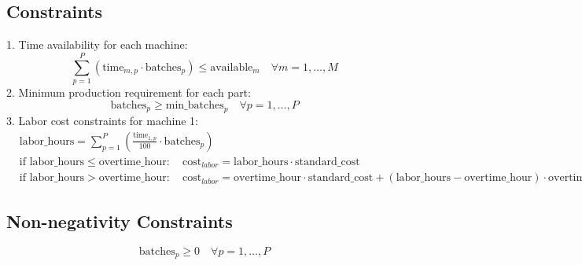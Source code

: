 \documentclass{article}
\begin{document}
\subsection*{Constraints}
1. Time availability for each machine:
\[
\sum_{p=1}^{P} \left( \text{time}_{m,p} \cdot \text{batches}_{p} \right) \leq \text{available}_{m} \quad \forall m = 1, \ldots, M
\]
2. Minimum production requirement for each part:
\[
\text{batches}_{p} \geq \text{min\_batches}_{p} \quad \forall p = 1, \ldots, P
\]
3. Labor cost constraints for machine 1:
\begin{align*}
& \text{labor\_hours} = \sum_{p=1}^{P} \left( \frac{\text{time}_{1,p}}{100} \cdot \text{batches}_{p} \right) \\
& \text{if } \text{labor\_hours} \leq \text{overtime\_hour}: \quad \text{cost}_{labor} = \text{labor\_hours} \cdot \text{standard\_cost} \\
& \text{if } \text{labor\_hours} > \text{overtime\_hour}: \quad \text{cost}_{labor} = \text{overtime\_hour} \cdot \text{standard\_cost} + (\text{labor\_hours} - \text{overtime\_hour}) \cdot \text{overtime\_cost}
\end{align*}

\subsection*{Non-negativity Constraints}
\[
\text{batches}_{p} \geq 0 \quad \forall p = 1, \ldots, P
\]
\end{document}
